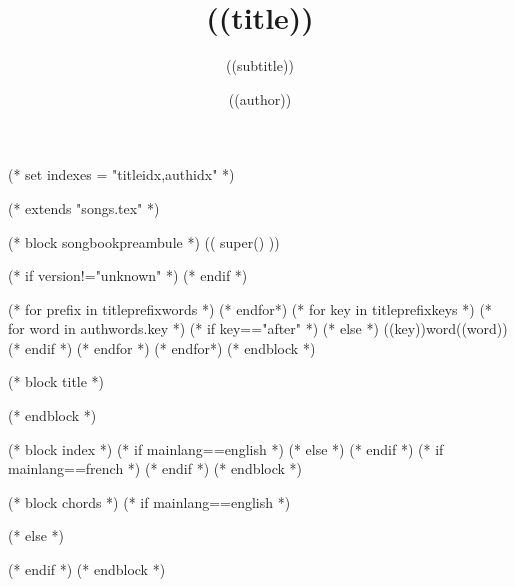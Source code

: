 (* set indexes = "titleidx,authidx" *)

(* extends "songs.tex" *)

(* block songbookpreambule *)
   (( super() ))

  \usepackage{chords}

   \title{((title))}
   \author{((author))}
   \subtitle{((subtitle))}
   (* if version!="unknown" *)
   (* endif *)


   (* for prefix in titleprefixwords *)
   (* endfor*)
   (* for key in titleprefixkeys *)
      (* for word in authwords.key *)
      (* if key=="after" *)
      (* else *)
      \auth((key))word{((word))}
      (* endif *)
      (* endfor *)
   (* endfor*)
(* endblock *)

(* block title *)
\maketitle
(* endblock *)

(* block index *)
   (* if mainlang==english *)
   (* else *)
   (* endif *)
   (* if mainlang==french *)
   (* endif *)
(* endblock *)

(* block chords *)
   \ifchorded
   (* if mainlang==english *)
   (* else *)
   (* endif *)
   \chords
   \fi
(* endblock *)

